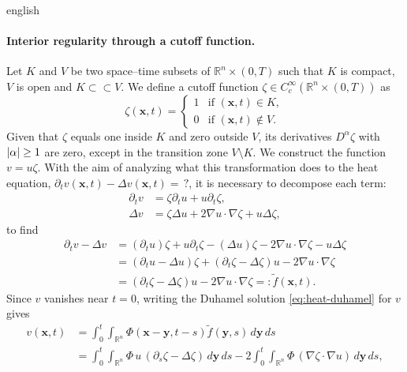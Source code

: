 \begin{hyphenrules}{english}
\paragraph{Interior regularity through a cutoff function.}
Let $K$ and $V$ be two
space--time subsets of $\mathbb{R}^n\times(0,T)$ such that $K$ is compact, $V$ is open and $K\subset\subset V$.
We define a cutoff function $\zeta\in C_c^\infty(\mathbb{R}^n\times(0,T))$ as
\begin{equation}
  \zeta(\mathbf{x},t)=
  \begin{cases}
    1 & \text{if } (\mathbf{x},t)\in K,\\
    0 & \text{if } (\mathbf{x},t)\notin V.
  \end{cases}
  \label{eq:cutoff}
\end{equation}
Given that $\zeta$ equals one inside $K$ and zero outside $V$, its derivatives $D^\alpha\zeta$ with
$\left\lvert \alpha \right\rvert\ge1$ are zero, except in the transition zone $V\setminus K$. We construct the function
$v=u\zeta$. With the aim of analyzing what this transformation does to the heat equation,
$\partial_t v(\mathbf{x},t)-\Delta v(\mathbf{x},t)=\,?$, it is necessary to decompose each term:
\begin{align}
  \partial_t v&=\zeta\partial_t u+u\partial_t\zeta, \label{eq:cut-dt}\\
  \Delta v&=\zeta\Delta u+2\nabla u\cdot\nabla\zeta+u\Delta\zeta, \label{eq:cut-lap}
\end{align}
to find
\begin{align}
  \partial_t v-\Delta v
    &=(\partial_t u)\zeta+u\partial_t\zeta-(\Delta u)\zeta-2\nabla u\cdot\nabla\zeta-u\Delta\zeta \label{eq:cut-1}\\
    &=(\partial_t u-\Delta u)\zeta+(\partial_t\zeta-\Delta\zeta)u-2\nabla u\cdot\nabla\zeta \label{eq:cut-2}\\
    &=(\partial_t\zeta-\Delta\zeta)u-2\nabla u\cdot\nabla\zeta=:\tilde f(\mathbf{x},t). \label{eq:cut-3}
\end{align}
Since $v$ vanishes near $t=0$, writing the Duhamel solution \eqref{eq:heat-duhamel} for $v$ gives
\begin{align}
  v(\mathbf{x},t)&=\int_0^t\!\!\int_{\mathbb{R}^n}\Phi(\mathbf{x}-\mathbf{y},t-s)\tilde f(\mathbf{y},s)\,d\mathbf{y}\,d s \label{eq:cut-4}\\
         &=\int_0^t\!\!\int_{\mathbb{R}^n}\Phi\,u\,(\partial_s\zeta-\Delta\zeta)\,d\mathbf{y}\,d s
           -2\int_0^t\!\!\int_{\mathbb{R}^n}\Phi\,(\nabla\zeta\cdot\nabla u)\,d\mathbf{y}\,d s, \label{eq:cut-5}

\end{align}
\end{hyphenrules}
